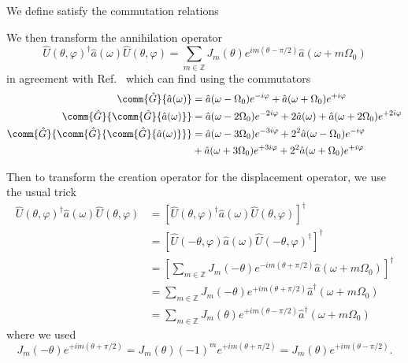 We define
satisfy the commutation relations


We then transform the annihilation operator
\begin{equation}
	\hat{U}(\theta,\varphi)^\dagger
	\hat{a}(\omega)
	\hat{U}(\theta,\varphi)
	=
	\sum_{m\in\mathbb{Z}}
	J_m(\theta)
	e^{im(\theta-\pi/2)}
	\hat{a}(\omega+m\Omega_0)
\end{equation}
in agreement with Ref.~\cite[eq.~40]{Horoshko2018} which can find using the commutators
\begin{align}
	\comm{\hat{G}}{\hat{a}(\omega)}
	&=
	\hat{a}(\omega-\Omega_0)
	e^{-i\varphi}
	+
	\hat{a}(\omega+\Omega_0)
	e^{+i\varphi}
	\\
	\comm{\hat{G}}{\comm{\hat{G}}{\hat{a}(\omega)}}
	&=
	\hat{a}(\omega-2\Omega_0)
	e^{-2i\varphi}
	+
	2\hat{a}(\omega)
	+
	\hat{a}(\omega+2\Omega_0)
	e^{+2i\varphi}
	\\
	\comm{\hat{G}}{\comm{\hat{G}}{\comm{\hat{G}}{\hat{a}(\omega)}}}
	&=
	\hat{a}(\omega-3\Omega_0)
	e^{-3i\varphi}
	+
	2^2
	\hat{a}(\omega-\Omega_0)
	e^{-i\varphi}
	\\
	&+
	\hat{a}(\omega+3\Omega_0)
	e^{+3i\varphi}
	+
	2^2
	\hat{a}(\omega+\Omega_0)
	e^{+i\varphi}
\end{align}

Then to transform the creation operator for the displacement operator, we use the usual trick
\begin{equation}
	\begin{split}
		\hat{U}(\theta,\varphi)^\dagger
		\hat{a}(\omega)
		\hat{U}(\theta,\varphi)
		&=
		\left[
			\hat{U}(\theta,\varphi)^\dagger
			\hat{a}(\omega)
			\hat{U}(\theta,\varphi)	
		\right]^\dagger
		\\
		&=
		\left[
			\hat{U}(-\theta,\varphi)
			\hat{a}(\omega)
			\hat{U}(-\theta,\varphi)^\dagger	
		\right]^\dagger
		\\
		&=
		\left[
			\sum_{m\in\mathbb{Z}}
			J_m(-\theta)
			e^{-im(\theta+\pi/2)}
			\hat{a}(\omega+m\Omega_0)
		\right]^\dagger
		\\
		&=
		\sum_{m\in\mathbb{Z}}
		J_m(-\theta)
		e^{+im(\theta+\pi/2)}
		\hat{a}^\dagger(\omega+m\Omega_0)
		\\
		&=
		\sum_{m\in\mathbb{Z}}
		J_m(\theta)
		e^{+im(\theta-\pi/2)}
		\hat{a}^\dagger(\omega+m\Omega_0)
	\end{split}
\end{equation}
where we used
\begin{equation}
	J_m(-\theta)
	e^{+im(\theta+\pi/2)}
	=
	J_m(\theta)
	(-1)^m
	e^{+im(\theta+\pi/2)}
	=
	J_m(\theta)
	e^{+im(\theta-\pi/2)}
	.
\end{equation}


